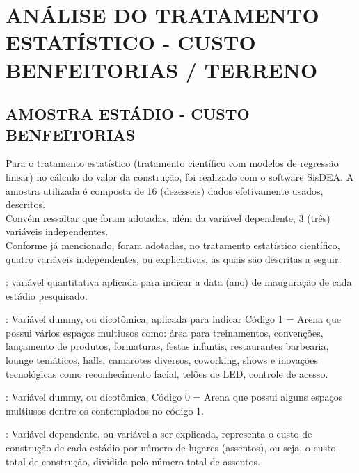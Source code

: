 
\section{ANÁLISE DO TRATAMENTO ESTATÍSTICO - CUSTO BENFEITORIAS / TERRENO}

\subsection{AMOSTRA ESTÁDIO - CUSTO BENFEITORIAS}
%
\hspace*{1.25 cm} Para o tratamento estatístico (tratamento científico com modelos de regressão linear) no cálculo do valor da construção, foi realizado com o software SisDEA. A amostra utilizada é composta de 16 (dezesseis) dados efetivamente usados, descritos.\\ 
%
\hspace*{1.25 cm} Convém ressaltar que foram adotadas, além da variável dependente, 3 (três) variáveis independentes.\\ 
%
\hspace*{1.25 cm} Conforme já mencionado, foram adotadas, no tratamento estatístico científico, quatro variáveis independentes, ou explicativas, as quais são descritas a seguir:
\begin{description}[itemsep=1pt,parsep=1pt]\vspace{0.00mm} 
	\item[DT (data)]  : variável quantitativa aplicada para indicar a data (ano) de inauguração de cada estádio pesquisado.
	\item[T1 (Padrão 1)]  : Variável dummy, ou dicotômica, aplicada para indicar Código 1 = Arena que possui vários espaços multiusos como: área para treinamentos, convenções, lançamento de produtos, formaturas, festas infantis, restaurantes barbearia, lounge temáticos, halls, camarotes diversos, coworking, shows e inovações tecnológicas como reconhecimento facial, telões de LED, controle de acesso.
	\item[T2 (Padrão 2)]  : Variável dummy, ou dicotômica, Código 0 = Arena que possui alguns espaços multiusos dentre os contemplados no código 1.
	\item[R\$/ASSENTO]  : Variável dependente, ou variável a ser explicada, representa o custo de construção de cada estádio por número de lugares (assentos), ou seja, o custo total de construção, dividido pelo número total de assentos. 
\end{description}
